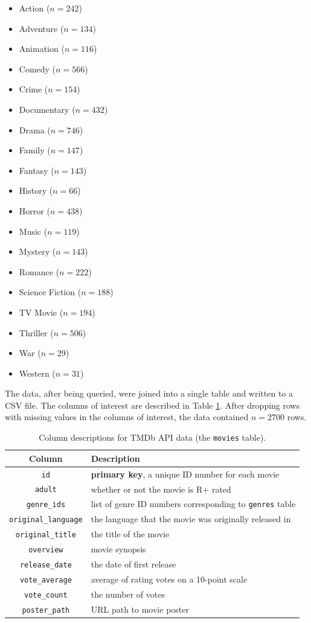 \documentclass[12pt, oneside]{article}   	%
\begin{document}
\begin{itemize}
\item Action ($n=242$)
\item Adventure ($n=134$)
\item Animation ($n=116$)
\item Comedy ($n=566$)
\item Crime ($n=154$)
\item Documentary ($n=432$)
\item Drama ($n=746$)
\item Family ($n=147$)
\item Fantasy ($n=143$)
\item History ($n=66$)
\item Horror ($n=438$)
\item Music ($n=119$)
\item Mystery ($n=143$)
\item Romance ($n=222$)
\item Science Fiction ($n=188$)
\item TV Movie ($n=194$)
\item Thriller ($n=506$)
\item War ($n=29$)
\item Western ($n=31$)
\end{itemize}

The data, after being queried, were joined into a single table and written to a CSV file. The columns of interest are described in Table \ref{table:cols_of_interest}. After dropping rows with missing values in the columns of interest, the data contained $n=2700$ rows.

\begin{table}
\begin{center}\begin{tabular}{c|l}
\textbf{Column} & \textbf{Description} \\ \hline
\texttt{id} & \textbf{primary key}, a unique ID number for each movie \\
\texttt{adult} & whether or not the movie is R+ rated \\
\texttt{genre\_ids} & list of genre ID numbers corresponding to \texttt{genres} table \\
\texttt{original\_language} & the language that the movie was originally released in \\
\texttt{original\_title} & the title of the movie \\
\texttt{overview} & movie synopsis \\
\texttt{release\_date} & the date of first release \\
\texttt{vote\_average} & average of rating votes on a 10-point scale \\
\texttt{vote\_count} & the number of votes \\
\texttt{poster\_path} & URL path to movie poster \\
\end{tabular}\end{center}
\caption{\label{table:cols_of_interest}Column descriptions for TMDb API data (the \texttt{movies} table).}
\end{table}
\end{document}
